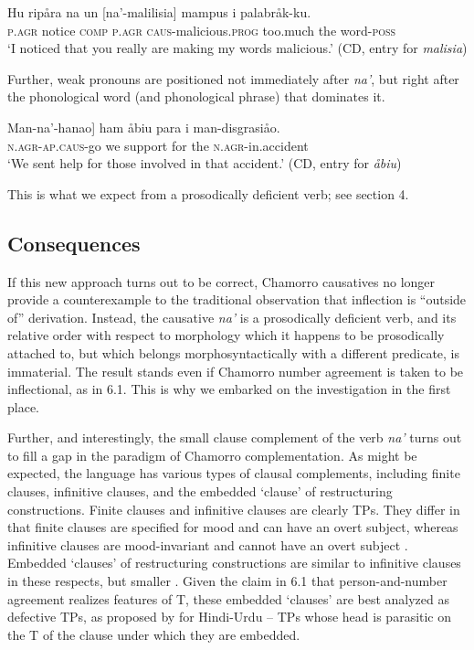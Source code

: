 \documentclass[output=paper,
modfonts
]{LSP/langsci}
\begin{document}
\begin{exe}
\begin{xlist}
\ex \gll  Hu ripåra na un {[}na'-malilisia{]} mampus i palabråk-ku.\\
\textsc{p.agr} notice \textsc{comp} \textsc{p.agr} \textsc{caus-}malicious.\textsc{prog}
too.much the word-\textsc{poss}\\
\glt `I noticed that you really are making my words malicious.' (CD, entry
for \emph{malisia})
\z
\z

Further, weak pronouns are positioned not immediately after \emph{na'},
but right after the phonological word (and phonological phrase) that
dominates it.

\ea
\gll {[}Man-na'-hanao{]} ham åbiu para i man-disgrasiåo.\\
\textsc{n.agr-ap.caus-}go we support for the \textsc{n.agr-}in.accident\\
\glt `We sent help for those involved in that accident.' (CD, entry for
\emph{åbiu})
\z

This is what we expect from a prosodically deficient verb; see section
4.

\subsection{Consequences}

If this new approach turns out to be correct, Chamorro causatives no
longer provide a counterexample to the traditional observation that
inflection is ``outside of'' derivation. Instead, the causative
\emph{na'} is a prosodically deficient verb, and its relative order with
respect to morphology which it happens to be prosodically attached to,
but which belongs morphosyntactically with a different predicate, is
immaterial. The result stands even if Chamorro number agreement is taken
to be inflectional, as in 6.1. This is why we embarked on the
investigation in the first place.

Further, and interestingly, the small clause complement of the verb
\emph{na'} turns out to fill a gap in the paradigm of Chamorro
complementation. As might be expected, the language has various types of
clausal complements, including finite clauses, infinitive clauses, and
the embedded `clause' of restructuring constructions. Finite clauses and
infinitive clauses are clearly TPs. They differ in that finite clauses
are specified for mood and can have an overt subject, whereas infinitive
clauses are mood-invariant and cannot have an overt subject \citep[see][64--68]{chung1998}. Embedded `clauses' of restructuring constructions are
similar to infinitive clauses in these respects, but smaller \citep[see][]{chung2004}. Given the claim in 6.1 that person-and-number agreement realizes
features of T, these embedded `clauses' are best analyzed as defective
TPs, as proposed by \citealt{bhatt2005} for Hindi-Urdu -- TPs whose head is
parasitic on the T of the clause under which they are embedded.


\end{xlist}
\end{exe}
\end{document}
